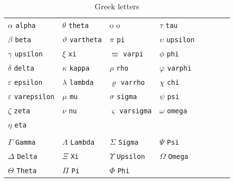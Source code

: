 \documentclass[12pt,a4paper,twoside,openright]{report}
\theoremstyle{definition}
\theoremstyle{itexmp}
\numberwithin{equation}{section}
\begin{document}
	\begin{table}[H]
	\centering
	\begin{tabular}{*8l}
	$\alpha$ \verb?alpha? &$\theta$ \verb?theta? & o o &$\tau$ \verb?tau? \\
	$\beta$ \verb?beta? &$\vartheta$ \verb?vartheta? &$\pi$ \verb?pi?         &$\upsilon$ \verb?upsilon? \\
	$\gamma$ \verb?upsilon? &$\xi$ \verb?xi?  &$\varpi$ \verb?varpi? &$\phi$ \verb?phi?  \\
	$\delta$ \verb?delta? &$\kappa$ \verb?kappa? &$\rho$ \verb?rho? &$\varphi$ \verb?varphi? \\
	$\varepsilon$ \verb?epsilon? &$\lambda$ \verb?lambda? &$\varrho$ \verb?varrho? &$\chi$ \verb?chi?  \\
	$\varepsilon$ \verb?varepsilon? &$\mu$ \verb?mu? &$\sigma$ \verb?sigma? &$\psi$ \verb?psi? \\
	$\zeta$ \verb?zeta? &$\nu$ \verb?nu? &$\varsigma$ \verb?varsigma? &$\omega$ \verb?omega? \\
	$\eta$ \verb?eta?\\
    \\
	$\Gamma$ \verb?Gamma? &$\Lambda$ \verb?Lambda? &$\Sigma$ \verb?Sigma? &$\Psi$ \verb?Psi? \\
	$\Delta$ \verb?Delta? &$\Xi$ \verb?Xi? &$\Upsilon$ \verb?Upsilon? &$\Omega$ \verb?Omega?\\
	$\Theta$ \verb?Theta? &$\Pi$ \verb?Pi? &$\Phi$ \verb?Phi?
	\end{tabular}
	\caption{Greek letters}\label{greek}
	\end{table}
\end{document}
